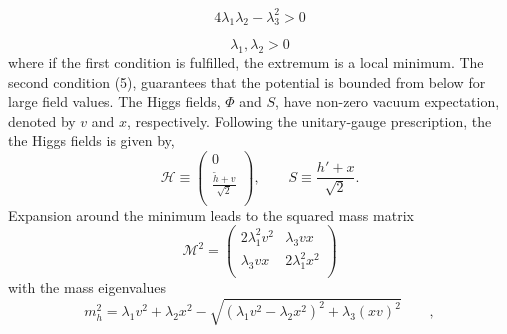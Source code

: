 \begin{equation}
 4 \lambda_1  \lambda_2 - \lambda_3^2 >0    \end{equation}

\begin{equation}
 \lambda_1 , \lambda_2  >0    \end{equation}
where if the first condition is fulfilled, the extremum is a local minimum. The
second condition (5), guarantees that the potential is bounded from below for large field values.
The Higgs fields, $\Phi$ and $S$, have non-zero vacuum expectation, denoted by $v$ and $x$, respectively.
Following the unitary-gauge prescription, the the Higgs fields is given by,
\newline
$$
{\mathcal H} \equiv \left(
\begin{array}{c}
0  \\
\frac{\tilde{h}+v }{\sqrt{2}}  \\
\end{array}
\right)
, \qquad 
S \equiv \frac{h'+x }{\sqrt{2}}
.
$$
Expansion around the minimum leads to the squared mass matrix
\newline
$$
{\mathcal M}^2 = \left(
\begin{array}{cc}
2 \lambda_1^2 v^2 & \lambda_3 vx  \\
\lambda_3 vx & 2 \lambda_1^2 x^2 \\

\end{array}
\right)
$$
\newline
with the mass eigenvalues
\begin{equation}
 m_h^2=  \lambda_1 v^2 + \lambda_2 x^2 -\sqrt{(\lambda_1 v^2 - \lambda_2 x^2)^2 +\lambda_3 (xv)^2 } \qquad,  \end{equation}

